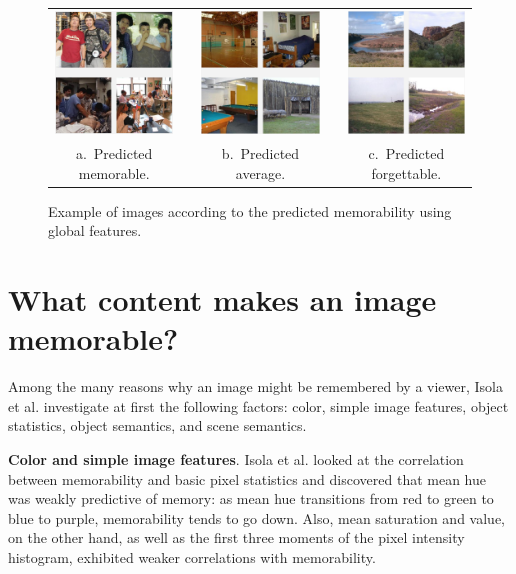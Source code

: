 \documentclass[10pt,twocolumn,letterpaper]{article}
\begin{document}
\begin{figure}[ht]
    \centering
    \begin{tabular}{c c c c c}
        \includegraphics[width=0.3\linewidth]{./figure/features_top.png} & &
        \includegraphics[width=0.3\linewidth]{./figure/features_average.png} & &
        \includegraphics[width=0.3\linewidth]{./figure/features_bottom.png} \\
        a.~Predicted memorable. & & b.~Predicted average. & & c.~Predicted forgettable.
    \end{tabular}
    \caption{Example of images according to the predicted memorability using global features.}
    \label{fig:images_features}
\end{figure}


\section{What content makes an image memorable?}
Among the many reasons why an image might be remembered by a viewer, Isola et al. investigate at first the following factors: color, simple image features, object statistics, object semantics, and scene semantics.

\textbf{Color and simple image features}. Isola et al. looked at the correlation between memorability and basic pixel statistics and discovered that mean hue was weakly predictive of memory: as mean hue transitions from red to green to blue to purple, memorability tends to go down. Also, mean saturation and value, on the other hand, as well as the first three moments of the pixel intensity histogram, exhibited weaker correlations with memorability. 
\end{document}
